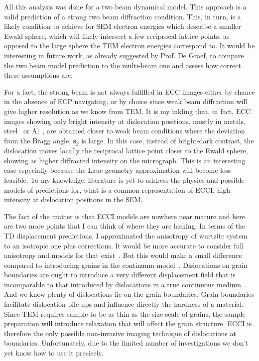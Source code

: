 All this analysis was done for a two beam dynamical model. This approach is a valid prediction of a strong two beam diffraction condition. This, in turn, is a likely condition to achieve for SEM electron energies which describe a smaller Ewald sphere, which will likely intersect a few reciprocal lattice points, as opposed to the large sphere the TEM electron energies correspond to. It would be interesting in future work, as already suggested by Prof. De Graef, to compare the two beam model prediction to the multi-beam one and assess how correct these assumptions are. 

For a fact, the strong beam is not always fulfilled in ECC images either by chance in the absence of ECP navigating, or by choice since weak beam diffraction will give higher resolution as we know from TEM. It is my inkling that, in fact, ECC images showing only bright intensity at dislocation positions, mostly in metals, \eg steel~\cite{Gutierrez09} or Al~\cite{Barnoush10}, are obtained closer to weak beam conditions where the deviation from the Bragg angle, $\mathbf{s}_g$ is large. In this case, instead of bright-dark contrast, the dislocation moves locally the reciprocal lattice point closer to the Ewald sphere, showing as higher diffracted intensity on the micrograph. This is an interesting case especially because the Laue geometry approximation will become less feasible. To my knowledge, literature is yet to address the physics and possible models of predictions for, what is a common representation of ECCI, high intensity at dislocation positions in the SEM. 

The fact of the matter is that ECCI models are nowhere near mature and here are two more points that I can think of where they are lacking. In terms of the TD displacement predictions, I approximated the anisotropy of wurtzite system to an isotropic one plus corrections. It would be more accurate to consider full anisotropy and models for that exist~\cite{Barnett71}. But this would make a small difference  compared to introducing grains in the continuum model~\cite{Read50}. Dislocations on grain boundaries are ought to introduce a very different displacement field that is incomparable to that introduced by dislocations in a true continuous medium~\cite{Van02}. And we know plenty of dislocations lie on the grain boundaries. Grain boundaries facilitate dislocation pile-ups and influence directly the hardness of a material. Since TEM requires sample to be as thin as the size scale of grains, the sample preparation will introduce relaxation that will affect the grain structure. ECCI is therefore the only possible non-invasive imaging technique of dislocations at boundaries. Unfortunately, due to the limited number of  investigations we don't yet know how to use it precisely.


